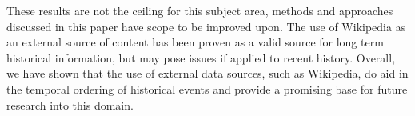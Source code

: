 \documentclass[bsc,frontabs,twoside,singlespacing,parskip,deptreport]{infthesis}     %
\begin{document}
These results are not the ceiling for this subject area, methods and approaches discussed in this paper have scope
to be improved upon. The use of Wikipedia as an external source of content has been proven as a valid source for
long term historical information, but may pose issues if applied to recent history. Overall, we have shown that the use of external
data sources, such as Wikipedia, do aid in the temporal ordering of historical events and provide a promising base for future
research into this domain.


\end{document}
